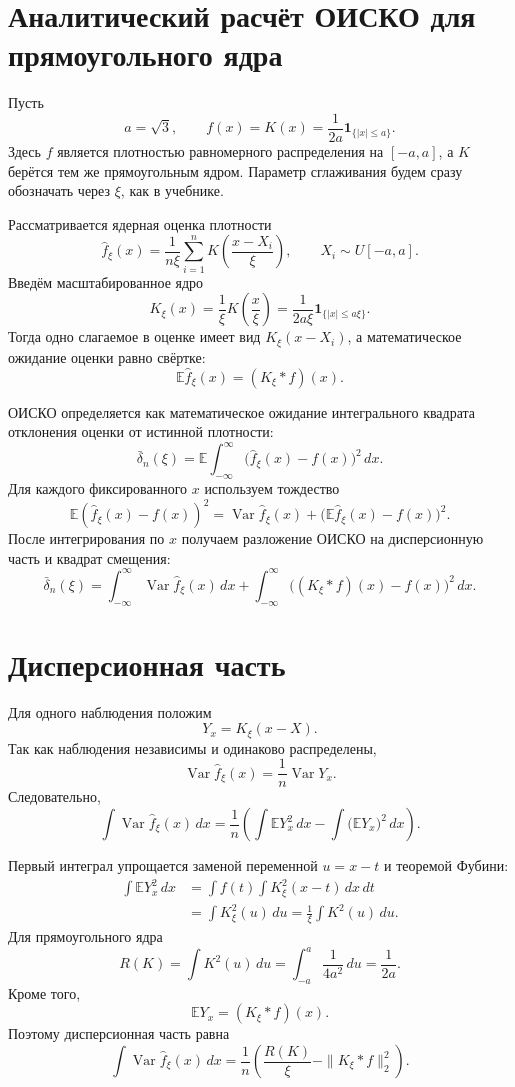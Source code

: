 \section*{Аналитический расчёт ОИСКО для прямоугольного ядра}

Пусть
\[
a=\sqrt{3},\qquad
f(x)=K(x)=\frac{1}{2a}\mathbf{1}_{\{|x|\le a\}}.
\]
Здесь $f$ является плотностью равномерного распределения на $[-a,a]$, а
$K$ берётся тем же прямоугольным ядром. Параметр сглаживания будем сразу
обозначать через $\xi$, как в учебнике.

Рассматривается ядерная оценка плотности
\[
\widehat f_\xi(x)=\frac{1}{n\xi}\sum_{i=1}^n
K\left(\frac{x-X_i}{\xi}\right),
\qquad X_i\sim U[-a,a].
\]
Введём масштабированное ядро
\[
K_\xi(x)=\frac{1}{\xi}K\left(\frac{x}{\xi}\right)
=\frac{1}{2a\xi}\mathbf{1}_{\{|x|\le a\xi\}}.
\]
Тогда одно слагаемое в оценке имеет вид $K_\xi(x-X_i)$, а математическое
ожидание оценки равно свёртке:
\[
\mathbb E\widehat f_\xi(x)=(K_\xi*f)(x).
\]

ОИСКО определяется как математическое ожидание интегрального квадрата
отклонения оценки от истинной плотности:
\[
\bar{\delta}_n(\xi)
=\mathbb E\int_{-\infty}^{\infty}
\bigl(\widehat f_\xi(x)-f(x)\bigr)^2\,dx.
\]
Для каждого фиксированного $x$ используем тождество
\[
\mathbb E(\widehat f_\xi(x)-f(x))^2
=\operatorname{Var}\widehat f_\xi(x)
+\bigl(\mathbb E\widehat f_\xi(x)-f(x)\bigr)^2.
\]
После интегрирования по $x$ получаем разложение ОИСКО на дисперсионную
часть и квадрат смещения:
\[
\bar{\delta}_n(\xi)
=\int_{-\infty}^{\infty}\operatorname{Var}\widehat f_\xi(x)\,dx
+\int_{-\infty}^{\infty}
\bigl((K_\xi*f)(x)-f(x)\bigr)^2\,dx.
\]

\section*{Дисперсионная часть}

Для одного наблюдения положим
\[
Y_x=K_\xi(x-X).
\]
Так как наблюдения независимы и одинаково распределены,
\[
\operatorname{Var}\widehat f_\xi(x)
=\frac{1}{n}\operatorname{Var}Y_x.
\]
Следовательно,
\[
\int \operatorname{Var}\widehat f_\xi(x)\,dx
=\frac{1}{n}
\left(
\int \mathbb E Y_x^2\,dx
-\int \bigl(\mathbb E Y_x\bigr)^2\,dx
\right).
\]

Первый интеграл упрощается заменой переменной $u=x-t$ и теоремой Фубини:
\[
\begin{aligned}
\int \mathbb E Y_x^2\,dx
&=\int f(t)\int K_\xi^2(x-t)\,dx\,dt\\
&=\int K_\xi^2(u)\,du
=\frac{1}{\xi}\int K^2(u)\,du.
\end{aligned}
\]
Для прямоугольного ядра
\[
R(K)=\int K^2(u)\,du
=\int_{-a}^{a}\frac{1}{4a^2}\,du
=\frac{1}{2a}.
\]
Кроме того,
\[
\mathbb E Y_x=(K_\xi*f)(x).
\]
Поэтому дисперсионная часть равна
\[
\int \operatorname{Var}\widehat f_\xi(x)\,dx
=\frac{1}{n}
\left(
\frac{R(K)}{\xi}-\|K_\xi*f\|_2^2
\right).
\]

